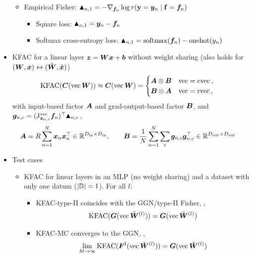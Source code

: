 \begin{itemize}
\begin{itemize}
    \item Empirical Fisher: $\blacktriangle_{n,1} = - \nabla_{{\bm{f}}_n} \log r({\mathbf{y}} = {\bm{y}}_n \mid {\mathbf{f}} = {\bm{f}}_n)$
      \begin{itemize}
      \item Square loss: $\blacktriangle_{n,1} = {\bm{y}}_n - {\bm{f}}_n$
      \item Softmax cross-entropy loss: $\blacktriangle_{n,1} = \mathrm{softmax}({\bm{f}}_n) - \mathrm{onehot}(y_n)$
      \end{itemize}
    \end{itemize}
  \item KFAC for a linear layer ${\bm{z}} = {\bm{W}} {\bm{x}} + {\bm{b}}$ without weight sharing (also holds for $({\bm{W}}, {\bm{x}}) \leftrightarrow (\tilde{{\bm{W}}}, \tilde{{\bm{x}}})$)
    \begin{align*}
      &\mathrm{KFAC}({\bm{C}}(\operatorname{vec} {\bm{W}})) \approx {\bm{C}}(\operatorname{vec} {\bm{W}})
      =
        \begin{cases}
          {\bm{A}} \otimes {\bm{B}} & \operatorname{vec} = \operatorname{cvec}\,,
          \\
          {\bm{B}} \otimes {\bm{A}} & \operatorname{vec} = \operatorname{rvec}\,,
        \end{cases}\,
    \end{align*}
    with input-based factor ${\bm{A}}$ and grad-output-based factor ${\bm{B}}$, and ${\bm{g}}_{n,c} = (\mathrm{J}_{{\bm{z}}_{n,s}}^{\operatorname{vec}}{\bm{f}}_n)^{\top} \blacktriangle_{n,c}\,$,
    \begin{align*}
      {\bm{A}} = R \sum_{n=1}^N {\bm{x}}_{n} {\bm{x}}_{n}^{\top} \in {\mathbb{R}}^{D_{\text{in}} \times D_{\text{in}}}, \qquad
      {\bm{B}} &= \frac{1}{N}\sum_{n=1}^N \sum_c {\bm{g}}_{n,c} {\bm{g}}_{n,c}^{\top}  \in {\mathbb{R}}^{D_{\text{out}} \times D_{\text{out}}}
    \end{align*}
  \item Test cases
    \begin{itemize}
      \item KFAC for linear layers in an MLP (no weight sharing) and a dataset with only one datum ($|{\mathbb{D}}| = 1$). For all $l$:
        \begin{itemize}
          \item KFAC-type-II coincides with the GGN/type-II Fisher, \ie,
            \begin{align*}
              \mathrm{KFAC}({\bm{G}}(\operatorname{vec}\tilde{{\bm{W}}}^{(l)})) = {\bm{G}}(\operatorname{vec} \tilde{{\bm{W}}}^{(l)})
            \end{align*}
          \item KFAC-MC converges to the GGN, \ie,
            \begin{align*}
              \lim_{M \to \infty} \kfac(\mF^{\text{I}}(\vec\tilde{\mW}^{(l)})) = \mG(\vec \tilde{\mW}^{(l)})

\end{align*}
\end{itemize}
\end{itemize}
\end{itemize}
